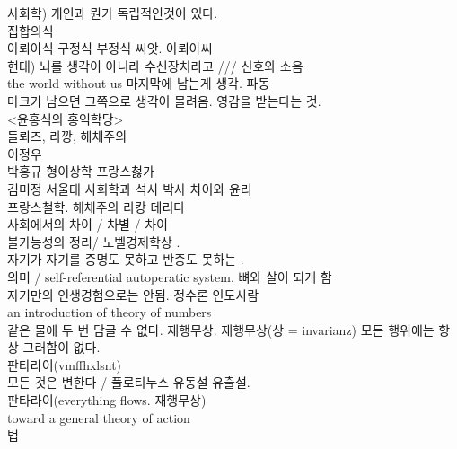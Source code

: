 \documentclass[12pt, a4paper]{article}
\begin{document}
사회학) 개인과 뭔가 독립적인것이 있다.\\
집합의식\\
아뢰아식 구정식 부정식 씨앗. 아뢰아씨\\
현대) 뇌를 생각이 아니라 수신장치라고 /// 신호와 소음\\
the world without us 마지막에 남는게 생각. 파동 \\
마크가 남으면 그쪽으로 생각이 몰려옴. 영감을 받는다는 것.\\ <윤홍식의 홍익학당>\\
들뢰즈, 라깡, 해체주의 \\
이정우\\
박홍규 형이상학 프랑스첧가\\
김미정 서울대 사회학과 석사 박사 차이와 윤리\\
프랑스철학. 해체주의 라캉 데리다\\
사회에서의 차이 / 차별 / 차이 \\
불가능성의 정리/ 노벨경제학상 . \\
자기가 자기를 증명도 못하고 반증도 못하는 .\\
의미 / self-referential autoperatic system. 뼈와 살이 되게 함 \\
자기만의 인생경험으로는 안됨. 정수론 인도사람\\
an introduction of theory of numbers\\
같은 물에 두 번 담글 수 없다. 재행무상. 재행무상(상 = invarianz) 모든 행위에는 항상 그러함이 없다.\\ 판타라이(vmffhxlsnt)\\
모든 것은 변한다 / 플로티누스 유동설 유출설.\\ 판타라이(everything flows. 재행무상)\\
toward a general theory of action\\
법\\
\end{document}
